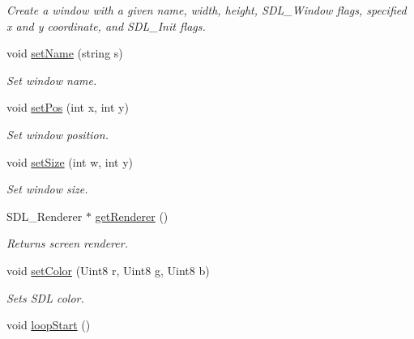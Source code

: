 \begin{DoxyCompactItemize}
\begin{DoxyCompactList}\small\item\em Create a window with a given name, width, height, S\+D\+L\+\_\+\+Window flags, specified x and y coordinate, and S\+D\+L\+\_\+\+Init flags. \end{DoxyCompactList}\item 
void \hyperlink{classEngine_ae59bcd31693811574953ba835ecb09bb}{set\+Name} (string s)\hypertarget{classEngine_ae59bcd31693811574953ba835ecb09bb}{}\label{classEngine_ae59bcd31693811574953ba835ecb09bb}

\begin{DoxyCompactList}\small\item\em Set window name. \end{DoxyCompactList}\item 
void \hyperlink{classEngine_a6133368973d175ef8915cc8033958b2b}{set\+Pos} (int x, int y)\hypertarget{classEngine_a6133368973d175ef8915cc8033958b2b}{}\label{classEngine_a6133368973d175ef8915cc8033958b2b}

\begin{DoxyCompactList}\small\item\em Set window position. \end{DoxyCompactList}\item 
void \hyperlink{classEngine_ada9e7e5de3b47113fc39fcabfe298f9e}{set\+Size} (int w, int y)\hypertarget{classEngine_ada9e7e5de3b47113fc39fcabfe298f9e}{}\label{classEngine_ada9e7e5de3b47113fc39fcabfe298f9e}

\begin{DoxyCompactList}\small\item\em Set window size. \end{DoxyCompactList}\item 
S\+D\+L\+\_\+\+Renderer $\ast$ \hyperlink{classEngine_ae42b73be55ab0fa034a0f7dea156cf9c}{get\+Renderer} ()\hypertarget{classEngine_ae42b73be55ab0fa034a0f7dea156cf9c}{}\label{classEngine_ae42b73be55ab0fa034a0f7dea156cf9c}

\begin{DoxyCompactList}\small\item\em Returns screen renderer. \end{DoxyCompactList}\item 
void \hyperlink{classEngine_aeee842a402f260e38e0502e1d95b920b}{set\+Color} (Uint8 r, Uint8 g, Uint8 b)\hypertarget{classEngine_aeee842a402f260e38e0502e1d95b920b}{}\label{classEngine_aeee842a402f260e38e0502e1d95b920b}

\begin{DoxyCompactList}\small\item\em Sets S\+DL color. \end{DoxyCompactList}\item 
void \hyperlink{classEngine_ad7602820f1b9d75ec1b59f2a6111085e}{loop\+Start} ()\hypertarget{classEngine_ad7602820f1b9d75ec1b59f2a6111085e}{}\label{classEngine_ad7602820f1b9d75ec1b59f2a6111085e}


\end{DoxyCompactItemize}
